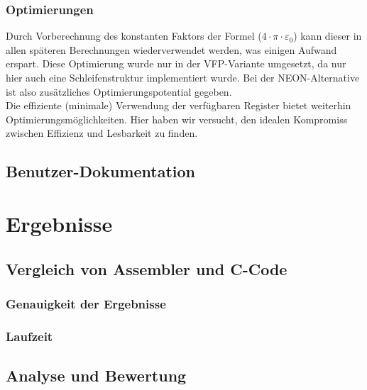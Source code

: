 \documentclass[11pt]{scrartcl}
\begin{document}
\subsubsection{Optimierungen}
Durch Vorberechnung des konstanten Faktors der Formel ($4 \cdot \pi \cdot \varepsilon_{0}$) kann dieser in allen späteren Berechnungen wiederverwendet werden, was einigen Aufwand erspart. Diese Optimierung wurde nur in der VFP-Variante umgesetzt, da nur hier auch eine Schleifenstruktur implementiert wurde. Bei der NEON-Alternative ist also zusätzliches Optimierungspotential gegeben.\\
Die effiziente (minimale) Verwendung der verfügbaren Register bietet weiterhin Optimierungsmöglichkeiten. Hier haben wir versucht, den idealen Kompromiss zwischen Effizienz und Lesbarkeit zu finden.\\
\subsection{Benutzer-Dokumentation}
\section{Ergebnisse}
\subsection{Vergleich von Assembler und C-Code}
\subsubsection{Genauigkeit der Ergebnisse}
\subsubsection{Laufzeit}
\subsection{Analyse und Bewertung}
\end{document}
